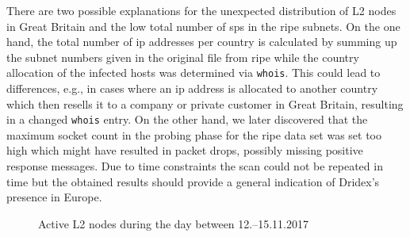 There are two possible explanations for the unexpected distribution of L2 nodes in Great Britain and the low total number of \glspl{sp} in the \gls{ripe} subnets.
On the one hand, the total number of \gls{ip} addresses per country is calculated by summing up the subnet numbers given in the original file from \gls{ripe} while the country allocation of the infected hosts was determined via \lstinline|whois|.
This could lead to differences, e.g., in cases where an \gls{ip} address is allocated to another country which then resells it to a company or private customer in Great Britain, resulting in a changed \lstinline|whois| entry.
On the other hand, we later discovered that the maximum socket count in the probing phase for the \gls{ripe} data set was set too high which might have resulted in packet drops, possibly missing positive response messages.
Due to time constraints the scan could not be repeated in time but the obtained results should provide a general indication of Dridex's presence in Europe.

\begin{figure}
    \centering
    \caption{Active L2 nodes during the day between 12.--15.11.2017\label{fig:CrawlingResults}}
\end{figure}

